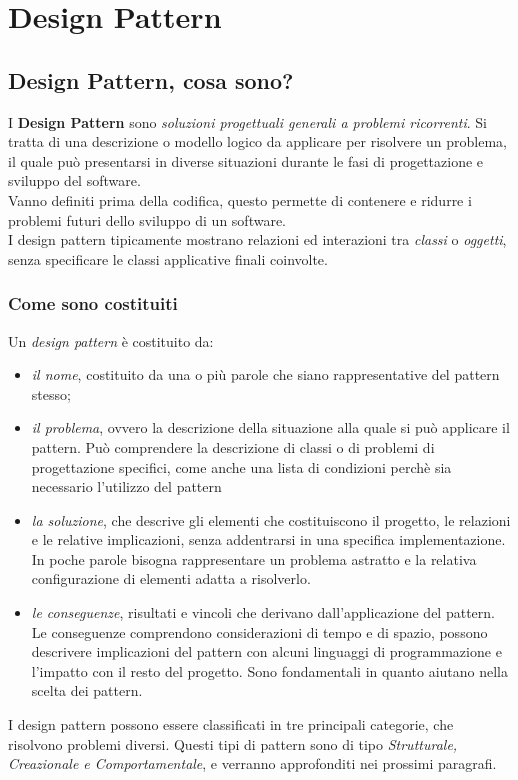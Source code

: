 \chapter{Design Pattern}
\section{Design Pattern, cosa sono?}
I \textbf{Design Pattern} sono \textit{soluzioni progettuali generali a problemi ricorrenti}. Si tratta di una descrizione o modello logico da applicare per risolvere un problema, il quale può presentarsi in diverse situazioni durante le fasi di progettazione e sviluppo del software.\\
Vanno definiti prima della codifica, questo permette di contenere e ridurre i problemi futuri dello sviluppo di un software.\\
I design pattern tipicamente mostrano relazioni ed interazioni tra \textit{classi} o \textit{oggetti}, senza specificare le classi applicative finali coinvolte.

\subsection{Come sono costituiti}
Un \textit{design pattern} è costituito da:
\begin{itemize}
	\item \textit{il nome}, costituito da una o più parole che siano rappresentative del pattern stesso;
	\item \textit{il problema}, ovvero la descrizione della situazione alla quale si può applicare il pattern. Può comprendere la descrizione di classi o di problemi di progettazione specifici, come anche una lista di condizioni perchè sia necessario l'utilizzo del pattern
	\item \textit{la soluzione}, che descrive gli elementi che costituiscono il progetto, le relazioni e le relative implicazioni, senza addentrarsi in una specifica implementazione. In poche parole bisogna rappresentare un problema astratto e la relativa configurazione di elementi adatta a risolverlo.
	\item \textit{le conseguenze}, risultati e vincoli che derivano dall'applicazione del pattern. Le conseguenze comprendono considerazioni di tempo e di spazio, possono descrivere implicazioni del pattern con alcuni linguaggi di programmazione e l'impatto con il resto del progetto. Sono fondamentali in quanto aiutano nella scelta dei pattern.
\end{itemize}
I design pattern possono essere classificati in tre principali categorie, che risolvono problemi diversi. Questi tipi di pattern sono di tipo \textit{Strutturale, Creazionale e Comportamentale}, e verranno approfonditi nei prossimi paragrafi.

